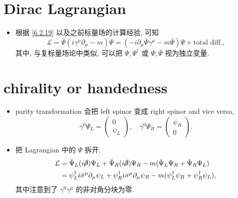 \section{Dirac Lagrangian}
\begin{itemize}
	\item 根据 \eqref{6.2.19} 以及之前标量场的计算经验, 可知
	\begin{equation} \label{7.2.1}
		\mathcal{L} = \bar{\Psi} (i \gamma^\mu \partial_\mu - m) \Psi = (- i \partial_\mu \bar{\Psi} \gamma^\mu - m \bar{\Psi}) \Psi + \text{total diff.},
	\end{equation}
	其中, 与复标量场论中类似, 可以把 $\Psi, \Psi^\dag$ 或 $\Psi, \bar{\Psi}$ 视为独立变量.
\end{itemize}

\section{chirality or handedness}
\begin{itemize}
	\item parity transformation 会把 left spinor 变成 right spinor and vice versa,
	\begin{equation}
		\gamma^0 \Psi_L = \begin{pmatrix}
			0 \\
			\psi_L
		\end{pmatrix}, \quad \gamma^0 \Psi_R = \begin{pmatrix}
			\psi_R \\
			0
		\end{pmatrix}.
	\end{equation}
	
	\item 把 Lagrangian 中的 $\Psi$ 拆开,
	\begin{align}
		\mathcal{L} &= \bar{\Psi}_L (i \cancel{\partial}) \Psi_L + \bar{\Psi}_R (i \cancel{\partial}) \Psi_R - m (\bar{\Psi}_L \Psi_R + \bar{\Psi}_R \Psi_L) \notag \\
		&= \psi_L^\dag i \bar{\sigma}^\mu \partial_\mu \psi_L + \psi_R^\dag i \sigma^\mu \partial_\mu \psi_R - m (\psi_L^\dag \psi_R + \psi_R^\dag \psi_L),
	\end{align}
	其中注意到了 $\gamma^0 \gamma^\mu$ 的非对角分块为零.
\end{itemize}

